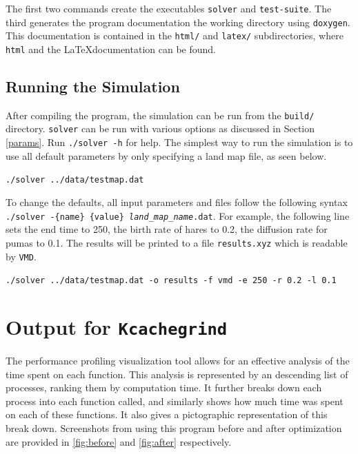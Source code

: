 \documentclass[a4paper,11pt]{article}
\begin{document}
\begin{appendices}
The first two commands create the executables \texttt{solver} and \texttt{test-suite}.   The third generates the program documentation the working directory using \texttt{doxygen}. This documentation is contained in the \texttt{html/} and \texttt{latex/} subdirectories, where \texttt{html} and the \LaTeX documentation can be found. 

\subsection{Running the Simulation}\label{syntax}

After compiling the program, the simulation can be run from the \texttt{build/} directory. \texttt{solver} can be run with various options as discussed in Section \ref{params}. Run \texttt{./solver -h} for help. The simplest way to run the simulation is to use all default parameters by only specifying a land map file, as seen below.

\vspace{5pt}
\noindent\texttt{./solver ../data/testmap.dat}
\vspace{5pt}

To change the defaults, all input parameters and files follow the following syntax \texttt{./solver -\{name\} \{value\} \emph{land\_map\_name}.dat}.  For example, the following line sets the end time to 250, the birth rate of hares to 0.2, the diffusion rate for pumas to 0.1.  The results will be printed to a file \texttt{results.xyz} which is readable by \texttt{VMD}.

\vspace{5pt}
\noindent\texttt{./solver ../data/testmap.dat -o results -f vmd -e 250 -r 0.2 -l 0.1}
\vspace{5pt}





\newpage
\section{Output for \texttt{Kcachegrind}}\label{Kcashegrind} 

The performance profiling visualization tool \label{Kcashegrind} allows for an effective analysis of the time spent on each function.  This analysis is represented by an descending list of processes, ranking them by computation time.  It further breaks down each process into each function called, and similarly shows how much time was spent on each of these functions.  It also gives a pictographic representation of this break down.  Screenshots from using this program before and after optimization are provided in \ref{fig:before} and \ref{fig:after} respectively.  


\end{appendices}
\end{document}
